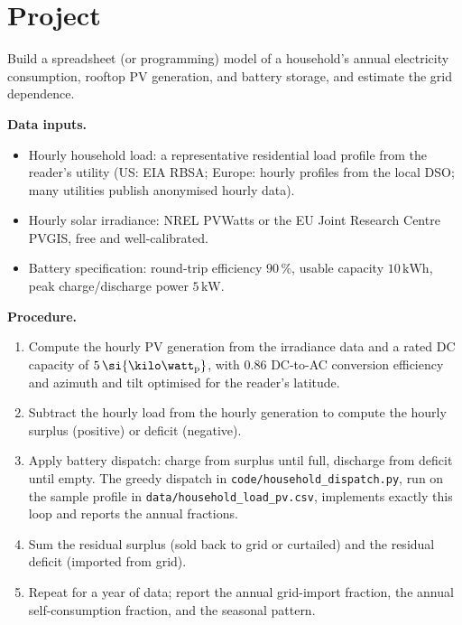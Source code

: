 \section{Project}

\begin{project}
Build a spreadsheet (or programming) model of a household's annual
electricity consumption, rooftop PV generation, and battery storage,
and estimate the grid dependence.

\textbf{Data inputs.}
\begin{itemize}[leftmargin=*]
  \item Hourly household load: a representative residential load
    profile from the reader's utility (US: EIA RBSA; Europe: hourly
    profiles from the local DSO; many utilities publish anonymised
    hourly data).
  \item Hourly solar irradiance: NREL PVWatts or the EU Joint
    Research Centre PVGIS, free and well-calibrated.
  \item Battery specification: round-trip efficiency $90\,\%$, usable
    capacity $10\,\si{\kilo\watt\hour}$, peak charge/discharge power
    $5\,\si{\kilo\watt}$.
\end{itemize}

\textbf{Procedure.}
\begin{enumerate}
  \item Compute the hourly PV generation from the irradiance data
    and a rated DC capacity of $5\,\si{\kilo\watt\textsubscript{p}}$,
    with $0.86$ DC-to-AC conversion efficiency and azimuth and tilt
    optimised for the reader's latitude.
  \item Subtract the hourly load from the hourly generation to
    compute the hourly surplus (positive) or deficit (negative).
  \item Apply battery dispatch: charge from surplus until full,
    discharge from deficit until empty. The greedy dispatch in
    \texttt{code/household\_dispatch.py}, run on the sample profile in
    \texttt{data/household\_load\_pv.csv}, implements exactly this loop
    and reports the annual fractions.
  \item Sum the residual surplus (sold back to grid or curtailed)
    and the residual deficit (imported from grid).
  \item Repeat for a year of data; report the annual grid-import
    fraction, the annual self-consumption fraction, and the
    seasonal pattern.
\end{enumerate}


\end{project}

